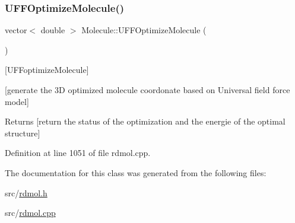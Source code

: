 \subsubsection{\texorpdfstring{U\+F\+F\+Optimize\+Molecule()}{UFFOptimizeMolecule()}}
{\footnotesize\ttfamily vector$<$ double $>$ Molecule\+::\+U\+F\+F\+Optimize\+Molecule (\begin{DoxyParamCaption}{ }\end{DoxyParamCaption})}



\mbox{[}U\+F\+Foptimize\+Molecule\mbox{]} 

\mbox{[}generate the 3D optimized molecule coordonate based on Universal field force model\mbox{]}

\begin{DoxyReturn}{Returns}
\mbox{[}return the status of the optimization and the energie of the optimal structure\mbox{]} 
\end{DoxyReturn}


Definition at line 1051 of file rdmol.\+cpp.



The documentation for this class was generated from the following files\+:\begin{DoxyCompactItemize}
\item 
src/\mbox{\hyperlink{rdmol_8h}{rdmol.\+h}}\item 
src/\mbox{\hyperlink{rdmol_8cpp}{rdmol.\+cpp}}\end{DoxyCompactItemize}

